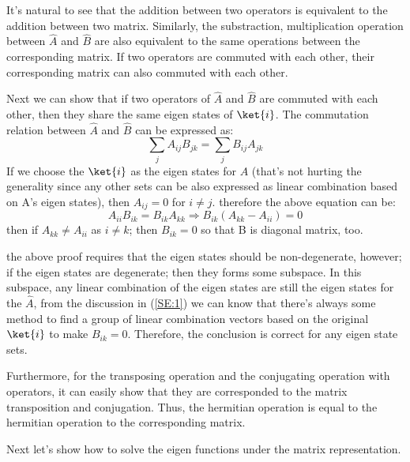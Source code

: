 It's natural to see that the addition between two operators is
equivalent to the addition between two matrix. Similarly, the
substraction, multiplication operation between $\hat{A}$ and
$\hat{B}$ are also equivalent to the same operations between the
corresponding matrix. If two operators are commuted with each other,
their corresponding matrix can also commuted with each other.

Next we can show that if two operators of $\hat{A}$ and $\hat{B}$
are commuted with each other, then they share the same eigen states
of $\ket{i}$. The commutation relation between $\hat{A}$ and
$\hat{B}$ can be expressed as:
\begin{equation}\label{}
\sum_{j}A_{ij}B_{jk} = \sum_{j}B_{ij}A_{jk}
\end{equation}
If we choose the $\ket{i}$ as the eigen states for $A$ (that's not
hurting the generality since any other sets can be also expressed as
linear combination based on A's eigen states), then $A_{ij} = 0$ for
$i\neq j$. therefore the above equation can be:
\begin{equation}\label{}
A_{ii}B_{ik} = B_{ik}A_{kk} \Rightarrow B_{ik}(A_{kk} - A_{ii}) = 0
\end{equation}
then if $A_{kk} \neq A_{ii}$ as $i \neq k$; then $B_{ik} = 0$ so
that B is diagonal matrix, too.

the above proof requires that the eigen states should be
non-degenerate, however; if the eigen states are degenerate; then
they forms some subspace. In this subspace, any linear combination
of the eigen states are still the eigen states for the $\hat{A}$,
from the discussion in (\ref{SE:1}) we can know that there's always
some method to find a group of linear combination vectors based on
the original $\ket{i}$ to make $B_{ik} = 0$. Therefore, the
conclusion is correct for any eigen state sets.

Furthermore, for the transposing operation and the conjugating
operation with operators, it can easily show that they are
corresponded to the matrix transposition and conjugation. Thus, the
hermitian operation is equal to the hermitian operation to the
corresponding matrix.

Next let's show how to solve the eigen functions under the matrix
representation.

